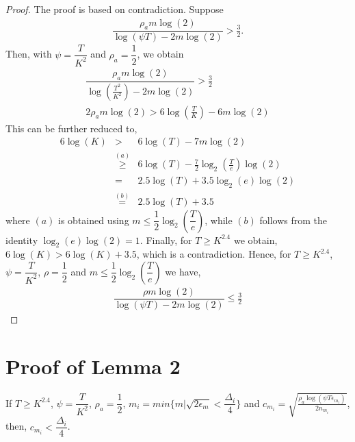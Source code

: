 \begin{proof}
The proof is based on contradiction. Suppose
\begin{eqnarray*}
\dfrac{\rho_a m \log(2)}{\log(\psi T) - 2m\log( 2)} > \frac{3}{2}.
\end{eqnarray*}
Then, with $\psi=\dfrac{T}{ K^2}$ and $\rho_a =\dfrac{1}{2}$, we obtain
\begin{eqnarray*}
\dfrac{\rho_a m \log(2)}{\log(\frac{T^2}{K^2}) - 2m\log( 2)} > \frac{3}{2}\\
2\rho_a m \log(2) > 6\log(\frac{T}{K}) - 6m\log( 2)
\end{eqnarray*}
This can be further reduced to,
\begin{eqnarray*}
6\log(K) 
&>& 6\log(T) - 7m\log(2) \\
&\overset{(a)}{\ge}& 6\log(T) - \frac{7}{2} \log_2\left(\frac{T}{e}\right) \log(2) \\
&=& 2.5\log(T) + 3.5 \log_2(e)\log(2)  \\
&\overset{(b)}{=}& 2.5\log(T) +3.5
\end{eqnarray*}
where $(a)$ is obtained using $m\leq \dfrac{1}{2} \log_2\left(\dfrac{T}{e}\right)$, while $(b)$ follows from the identity $\log_2(e)\log(2) =1$. Finally, for $T\ge K^{2.4}$ we obtain, $6\log(K)>6\log(K)+3.5$, which is a contradiction. Hence, for $T\geq K^{2.4}$, $\psi=\dfrac{T}{ K^2}$, $\rho=\dfrac{1}{2}$ and $m \leq \dfrac{1}{2} \log_2\left(\dfrac{T}{e}\right) $ we have, 
\begin{align*}
\dfrac{\rho m \log(2)}{\log(\psi T) - 2m\log( 2)} \leq \frac{3}{2}
\end{align*}
\end{proof}

\section{Proof of Lemma 2}
\label{App:Lemma2}
\begin{lemma}
\label{proofTheorem:Lemma:2}
If $T\geq K^{2.4}$, $\psi=\dfrac{T}{ K^2}$, $\rho_a =\dfrac{1}{2}$, $m_i = min\lbrace m|\sqrt{2\epsilon_{m} } < \dfrac{\Delta_i}{4} \rbrace $ and $c_{m_i} =\sqrt{\frac{\rho_{a}\log (\psi T\epsilon_{m_{i}})}{2 n_{m_i}}}$, then, $c_{m_i} < \dfrac{\Delta_i}{4}$.
\end{lemma}

